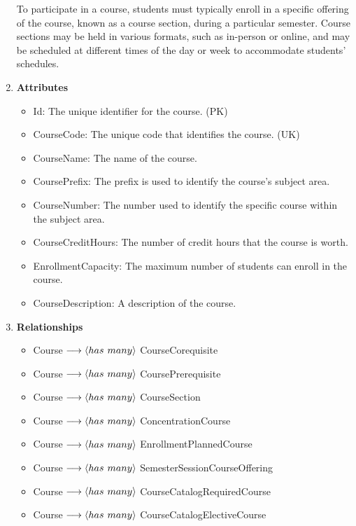 \documentclass[12pt]{article}
\begin{document}
\begin{appendices}
\begin{enumerate}[label=(\roman*)]
    To participate in a course, students must typically enroll in a specific offering of the course, known as a course section, during a particular semester. Course sections may be held in various formats, such as in-person or online, and may be scheduled at different times of the day or week to accommodate students' schedules.
    \item[] \textbf{Attributes}
    \begin{itemize}
        \item Id: The unique identifier for the course. (PK)
        \item CourseCode: The unique code that identifies the course. (UK)
        \item CourseName: The name of the course.
        \item CoursePrefix: The prefix is used to identify the course's subject area.
        \item CourseNumber: The number used to identify the specific course within the subject area.
        \item CourseCreditHours: The number of credit hours that the course is worth.
        \item EnrollmentCapacity: The maximum number of students can enroll in the course.
        \item CourseDescription: A description of the course.
    \end{itemize}
    \item[] \textbf{Relationships}
    \begin{itemize}
        \item Course $ \longrightarrow \langle has \hspace{0.125cm} many \rangle $ CourseCorequisite
        \item Course $ \longrightarrow \langle has \hspace{0.125cm} many \rangle $ CoursePrerequisite
        \item Course $ \longrightarrow \langle has \hspace{0.125cm} many \rangle $ CourseSection
        \item Course $ \longrightarrow \langle has \hspace{0.125cm} many \rangle $ ConcentrationCourse
        \item Course $ \longrightarrow \langle has \hspace{0.125cm} many \rangle $ EnrollmentPlannedCourse
        \item Course $ \longrightarrow \langle has \hspace{0.125cm} many \rangle $ SemesterSessionCourseOffering
        \item Course $ \longrightarrow \langle has \hspace{0.125cm} many \rangle $ CourseCatalogRequiredCourse
        \item Course $ \longrightarrow \langle has \hspace{0.125cm} many \rangle $ CourseCatalogElectiveCourse
    \end{itemize}


\end{enumerate}
\end{appendices}
\end{document}
